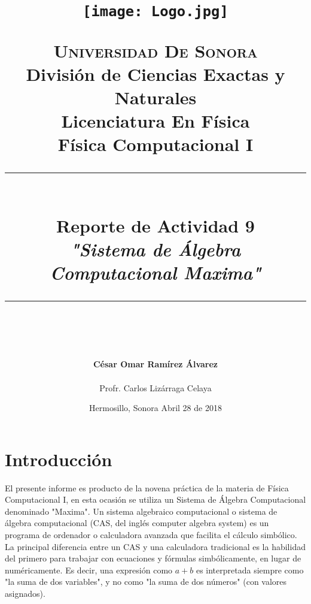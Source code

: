\documentclass[12pt]{article}
\newcommand{\HRule}[1]{\rule{\linewidth}{#1}}
\begin{document}
\begin{titlepage}

\title{ \normalsize 
        \begin{center}
        \texttt{[image: Logo.jpg]}
        \end{center}
        \LARGE \textsc{\textbf{Universidad De Sonora}} \\ \bigskip
		\Large División de Ciencias Exactas y Naturales \\
        Licenciatura En Física \\ \bigskip
        \bigskip
        Física Computacional I
		\\ [0.1cm]  
		\HRule{2pt} \\
		\Large \textbf{{Reporte de Actividad 9}} \\
        \textit{\textbf{"Sistema de Álgebra Computacional Maxima"}}
		\HRule{2pt} \\
		\normalsize \vspace*{0.001\baselineskip}}
        
\date{\bigskip \Large Hermosillo, Sonora  \hspace*{\fill}  Abril 28 de 2018}

        
\author{
		\Large\textbf{ César Omar Ramírez Álvarez} \\ \bigskip
        \\ \bigskip
       \Large Profr. Carlos Lizárraga Celaya}
       \end{titlepage}
       \maketitle
       
\newpage
\pagestyle{plain}
\section*{Introducción}
 El presente informe es producto de la novena práctica de la materia de Física Computacional I, en esta ocasión se utiliza un Sistema de Álgebra Computacional denominado "Maxima".
Un sistema algebraico computacional o sistema de álgebra computacional (CAS, del inglés computer algebra system) es un programa de ordenador o calculadora avanzada que facilita el cálculo simbólico. La principal diferencia entre un CAS y una calculadora tradicional es la habilidad del primero para trabajar con ecuaciones y fórmulas simbólicamente, en lugar de numéricamente. Es decir, una expresión como $a + b$ es interpretada siempre como "la suma de dos variables", y no como "la suma de dos números" (con valores asignados). \\
\end{document}
